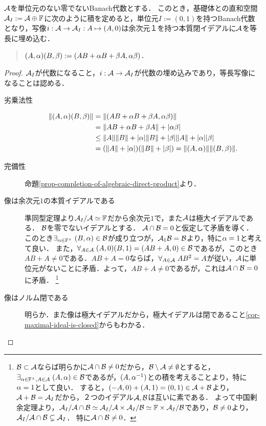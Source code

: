 \documentclass[uplatex,dvipdfmx]{jsreport}
\begin{document}
\begin{proposition}[Banach代数の単位化]
    $\mathcal{A}$を単位元のない零でないBanach代数とする．
    このとき，基礎体との直和空間$\mathcal{A}_I:=\mathcal{A}\oplus\mathbb{F}$に次のように積を定めると，単位元$I:=(0,1)$を持つBanach代数となり，写像$i:\mathcal{A}\to\mathcal{A}_I:A\mapsto(A,0)$は余次元１を持つ本質閉イデアルに$\mathcal{A}$を等長に埋め込む．
    \begin{quote}
        $(A,\alpha)(B,\beta):=(AB+\alpha B+\beta A,\alpha\beta)$．
    \end{quote}
\end{proposition}
\begin{proof}
    $\mathcal{A}_I$が代数になること，$i:\mathcal{A}\to\mathcal{A}_I$が代数の埋め込みであり，等長写像になることは認める．
    \begin{description}
        \item[劣乗法性] \begin{align*}
            \|(A,\alpha)(B,\beta)\|&=\|(AB+\alpha B+\beta A,\alpha\beta)\|\\
            &=\|AB+\alpha B+\beta A\|+\lvert\alpha\beta\rvert\\
            &\le\|A\|\|B\|+\lvert\alpha\rvert\|B\|+\lvert\beta\rvert\|A\|+\lvert\alpha\rvert\lvert\beta\rvert\\
            &=(\|A\|+\lvert\alpha\rvert)(\|B\|+\lvert\beta\rvert)=\|(A,\alpha)\|\|(B,\beta)\|.
        \end{align*}
        \item[完備性] 命題\ref{prop-completion-of-algebraic-direct-product}より．
        \item[像は余次元$1$の本質イデアルである] 準同型定理より$\mathcal{A}_I/\mathcal{A}\simeq\mathbb{F}$だから余次元$1$で，また$\mathcal{A}$は極大イデアルである．
        $\mathcal{B}$を零でないイデアルとする．
        $\mathcal{A}\cap\mathcal{B}=0$と仮定して矛盾を導く．
        このとき$\exists_{\alpha\in\mathbb{F}^\times}\;(B,\alpha)\in\mathcal{B}$が成り立つが，$\mathcal{A}_1\mathcal{B}=\mathcal{B}$より，特に$\alpha=1$と考えて良い．
        また，$\forall_{A\in\mathcal{A}}\;(A,0)(B,1)=(AB+A,0)\in\mathcal{B}$であるが，このとき$AB+A\ne0$である．$AB+A=0$ならば，$\forall_{A\in\mathcal{A}}\;AB^2=A$が従い，$\mathcal{A}$に単位元がないことに矛盾．よって，$AB+A\ne0$であるが，これは$\mathcal{A}\cap\mathcal{B}=0$に矛盾．
        \footnote{$\mathcal{B}\subset\mathcal{A}$ならば明らかに$\mathcal{A}\cap\mathcal{B}\ne0$だから，$\mathcal{B}\setminus\mathcal{A}\ne\emptyset$とすると，$\exists_{\alpha\in\mathbb{F}^\times,A\in\mathcal{A}}\;(A,\alpha)\in\mathcal{B}$であるが，$(A,\alpha^{-1})$との積を考えることより，特に$\alpha=1$として良い．
        すると，$(-A,0)+(A,1)=(0,1)\in \mathcal{A}+\mathcal{B}$より，$\mathcal{A}+\mathcal{B}=\mathcal{A}_I$だから，２つのイデアル$\mathcal{A},\mathcal{B}$は互いに素である．
        よって中国剰余定理より，$\mathcal{A}_I/\mathcal{A}\cap\mathcal{B}\simeq\mathcal{A}_I/\mathcal{A}\times\mathcal{A}_I/\mathcal{B}\simeq\mathbb{F}\times\mathcal{A}_I/\mathcal{B}$であり，$\mathcal{B}\ne0$より，$\mathcal{A}_I/\mathcal{A}\cap\mathcal{B}\subsetneq\mathcal{A}_I$．
        特に$\mathcal{A}\cap\mathcal{B}\ne0$．}
        \item[像はノルム閉である]
        明らか．また像は極大イデアルだから，極大イデアルは閉であること\ref{cor-maximal-ideal-is-closed}からもわかる．
    \end{description}
\end{proof}
\end{document}
